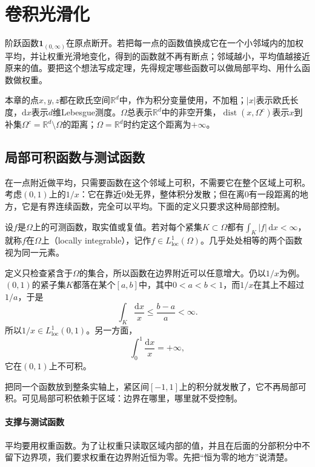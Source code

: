 \section{卷积光滑化}
\label{sec:weakd-convolution-smoothing}

阶跃函数$\mathbf 1_{(0,\infty)}$在原点断开。若把每一点的函数值换成它在一个小邻域内的加权平均，并让权重光滑地变化，得到的函数就不再有断点；邻域越小，平均值越接近原来的值。要把这个想法写成定理，先得规定哪些函数可以做局部平均、用什么函数做权重。

本章的点$x,y,z$都在欧氏空间$\mathbb R^d$中，作为积分变量使用，不加粗；$\lvert x\rvert$表示欧氏长度，$\mathrm dx$表示$d$维Lebesgue测度。$\Omega$总表示$\mathbb R^d$中的非空开集，$\operatorname{dist}(x,\Omega^{c})$表示$x$到补集$\Omega^{c}=\mathbb R^d\setminus\Omega$的距离；$\Omega=\mathbb R^d$时约定这个距离为$+\infty$。

\subsection{局部可积函数与测试函数}
\label{sec:weakd-local-integrability}

在一点附近做平均，只需要函数在这个邻域上可积，不需要它在整个区域上可积。考虑$(0,1)$上的$1/x$：它在靠近$0$处无界，整体积分发散；但在离$0$有一段距离的地方，它是有界连续函数，完全可以平均。下面的定义只要求这种局部控制。

\begin{definition}[局部可积]
\label{def:weakd-locally-integrable}
设$f$是$\Omega$上的可测函数，取实值或复值。若对每个紧集$K\subset\Omega$都有$\int_K\lvert f\rvert\,\mathrm dx<\infty$，就称$f$在$\Omega$上（locally integrable），记作$f\in L^1_{\mathrm{loc}}(\Omega)$。几乎处处相等的两个函数视为同一元素。
\end{definition}

定义只检查紧含于$\Omega$的集合，所以函数在边界附近可以任意增大。仍以$1/x$为例。$(0,1)$的紧子集$K$都落在某个$[a,b]$中，其中$0<a<b<1$，而$1/x$在其上不超过$1/a$，于是
\[
\int_K\frac{\mathrm dx}{x}\leq\frac{b-a}{a}<\infty .
\]
所以$1/x\in L^1_{\mathrm{loc}}(0,1)$。另一方面，
\[
\int_0^1\frac{\mathrm dx}{x}=+\infty ,
\]
它在$(0,1)$上不可积。

把同一个函数放到整条实轴上，紧区间$[-1,1]$上的积分就发散了，它不再局部可积。可见局部可积依赖于区域：边界在哪里，哪里就不受控制。

\paragraph{支撑与测试函数}
平均要用权重函数。为了让权重只读取区域内部的值，并且在后面的分部积分中不留下边界项，我们要求权重在边界附近恒为零。先把“恒为零的地方”说清楚。

